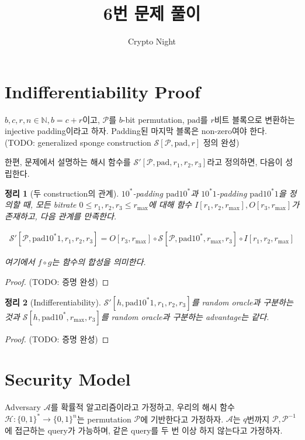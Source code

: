\documentclass{article}
\title{6번 문제 풀이}
\author{Crypto Night}
\newtheorem{theorem}{정리}
\begin{document}
  \maketitle

  \section{Indifferentiability Proof}
  \(b, c, r, n \in \mathbb{N}, b = c + r\)이고, \(\mathcal{P}\)를 \(b\)-bit permutation, \(\mathrm{pad}\)를 \(r\)비트 블록으로 변환하는 injective padding이라고 하자. Padding된 마지막 블록은 non-zero여야 한다.
  (TODO: generalized sponge construction \(\mathcal{S}[\mathcal{P}, \mathrm{pad}, r]\)  정의 완성)

  한편, 문제에서 설명하는 해시 함수를 \(\mathcal{S}'[\mathcal{P}, \mathrm{pad}, r_1, r_2, r_3]\)라고 정의하면, 다음이 성립한다.

  \begin{theorem}[두 construction의 관계]
    \(10^*\)-padding \(\mathrm{pad10^*}\)과 \(10^*1\)-padding \(\mathrm{pad10^*1}\)을 정의할 때, 모든 bitrate \(0 \leq r_1, r_2, r_3 \leq r_\mathrm{max}\)에 대해 함수 \(I[r_1, r_2, r_\mathrm{max}], O[r_3, r_\mathrm{max}]\)가 존재하고, 다음 관계를 만족한다.

    \begin{align*}
      \mathcal{S}'[\mathcal{P}, \mathrm{pad10^*1}, r_1, r_2, r_3] = O[r_3, r_\mathrm{max}] \circ \mathcal{S}[\mathcal{P}, \mathrm{pad10^*}, r_\mathrm{max}, r_3] \circ I[r_1, r_2, r_\mathrm{max}]
    \end{align*}

    여기에서 \(f \circ g\)는 함수의 합성을 의미한다.
  \end{theorem}
  \begin{proof}
    (TODO: 증명 완성)
  \end{proof}

  \begin{theorem}[Indifferentiability]
    \(\mathcal{S}'[h, \mathrm{pad10^*1}, r_1, r_2, r_3]\)를 random oracle과 구분하는 것과 \(\mathcal{S}[h, \mathrm{pad10^*}, r_\mathrm{max}, r_3]\)를 random oracle과 구분하는 advantage는 같다.
  \end{theorem}
  \begin{proof}
    (TODO: 증명 완성)
  \end{proof}

  \section{Security Model}
  Adversary \(\mathcal{A}\)를 확률적 알고리즘이라고 가정하고, 우리의 해시 함수 \(\mathcal{H}: \{0, 1\}^* \to \{0, 1\}^n\)는 permutation \(\mathcal{P}\)에 기반한다고 가정하자. \(\mathcal{A}\)는 \(q\)번까지 \(\mathcal{P}, \mathcal{P}^{-1}\)에 접근하는 query가 가능하며, 같은 query를 두 번 이상 하지 않는다고 가정하자.
\end{document}
